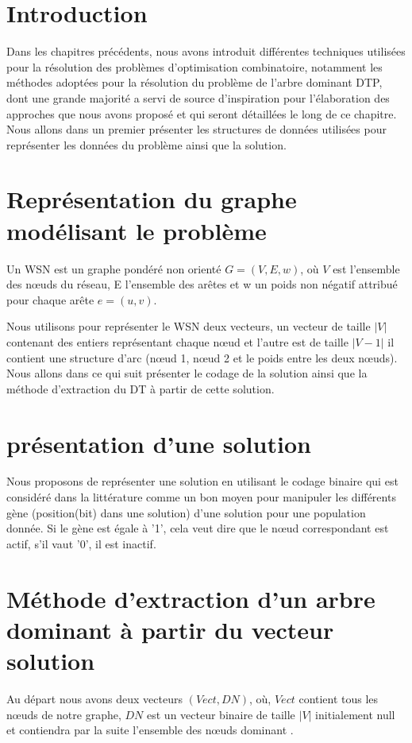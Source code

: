 


\section{Introduction}
Dans les chapitres précédents, nous avons introduit différentes techniques utilisées pour la résolution des problèmes d’optimisation combinatoire, notamment les méthodes adoptées pour la résolution du problème de l’arbre dominant DTP, dont une grande majorité a servi de source d’inspiration pour l’élaboration des approches que nous avons proposé et qui seront détaillées le long de ce chapitre.  Nous allons dans un premier présenter les structures de données utilisées pour représenter les données du problème ainsi que la solution.

\section{Représentation du graphe modélisant le problème}
Un WSN est un graphe pondéré non orienté $G=(V,E,w)$, où $V$ est l’ensemble des nœuds du réseau, E l’ensemble des arêtes et w un poids non négatif attribué pour chaque arête $e=(u,v)$. 

Nous utilisons pour représenter le WSN deux vecteurs, un vecteur de taille $|V|$ contenant des entiers représentant chaque nœud et l’autre est de taille $|V-1|$ il contient une structure d’arc (nœud 1, nœud 2 et le poids entre les deux nœuds). Nous allons dans ce qui suit présenter le codage de la solution ainsi que la méthode d'extraction du DT à partir de cette solution.


\section{présentation d’une solution}
Nous proposons de représenter une solution en utilisant le codage binaire qui est considéré dans la littérature comme un bon moyen pour manipuler les différents gène (position(bit) dans une solution) d’une solution pour une population donnée. Si le gène est égale à '1', cela veut dire que le nœud correspondant est actif, s'il vaut '0', il est inactif.


\section{Méthode d'extraction d'un arbre dominant à partir du vecteur solution}
Au départ nous avons deux vecteurs $(Vect, DN)$, où, $Vect$ contient tous les nœuds de notre graphe, $DN$ est un vecteur binaire de taille $|V|$ initialement null et contiendra par la suite l’ensemble des nœuds dominant .

